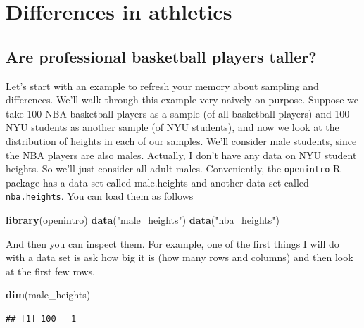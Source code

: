 \documentclass[openany]{book}
\newenvironment{Shaded}{\begin{snugshade}}{\end{snugshade}}
\newcommand{\KeywordTok}[1]{\textcolor[rgb]{0.13,0.29,0.53}{\textbf{#1}}}
\newcommand{\NormalTok}[1]{#1}
\newcommand{\StringTok}[1]{\textcolor[rgb]{0.31,0.60,0.02}{#1}}
\begin{document}
\hypertarget{differences-in-athletics}{%
\chapter{Differences in athletics}\label{differences-in-athletics}}

\hypertarget{are-professional-basketball-players-taller}{%
\section*{Are professional basketball players taller?}\label{are-professional-basketball-players-taller}}

Let's start with an example to refresh your memory about sampling and differences. We'll walk through this example very naively on purpose. Suppose we take 100 NBA basketball players as a sample (of all basketball players) and 100 NYU students as another sample (of NYU students), and now we look at the distribution of heights in each of our samples. We'll consider male students, since the NBA players are also males. Actually, I don't have any data on NYU student heights. So we'll just consider all adult males. Conveniently, the \texttt{openintro} R package has a data set called male.heights and another data set called \texttt{nba.heights}. You can load them as follows

\begin{Shaded}
\begin{Highlighting}[]
\KeywordTok{library}\NormalTok{(openintro)}
\KeywordTok{data}\NormalTok{(}\StringTok{"male_heights"}\NormalTok{)}
\KeywordTok{data}\NormalTok{(}\StringTok{"nba_heights"}\NormalTok{)}
\end{Highlighting}
\end{Shaded}

And then you can inspect them. For example, one of the first things I will do with a data set is ask how big it is (how many rows and columns) and then look at the first few rows.

\begin{Shaded}
\begin{Highlighting}[]
\KeywordTok{dim}\NormalTok{(male_heights)}
\end{Highlighting}
\end{Shaded}

\begin{verbatim}
## [1] 100   1
\end{verbatim}
\end{document}
